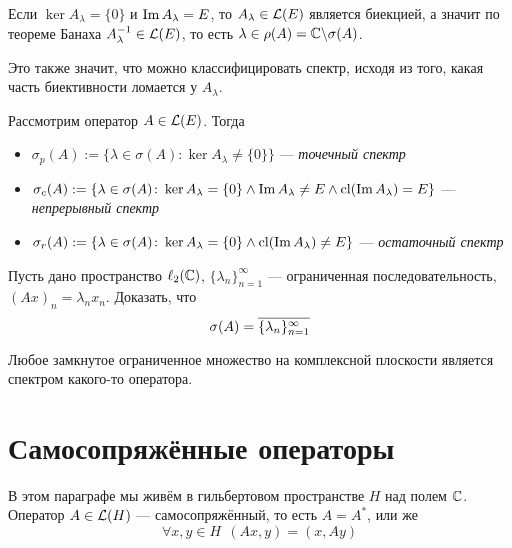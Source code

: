 \begin{note}
	Если $\ker A_\lambda = \{0\}$ и  $\operatorname{Im} A_\lambda = E$, то $A_\lambda \in \mathcal{L}(E)$ является биекцией, а значит по теореме Банаха $A_\lambda^{-1} \in \mathcal{L}(E)$, то есть $\lambda \in \rho(A) = \mathbb{C} \backslash \sigma(A)$.
	
	Это также значит, что можно классифицировать спектр, исходя из того, какая часть биективности ломается у $A_\lambda$.
\end{note}

\begin{definition}
	Рассмотрим оператор $A \in \mathcal{L}(E)$. Тогда
	\begin{itemize}
		\item $\sigma_p(A) := \{\lambda \in \sigma(A) \colon \ker A_\lambda \neq \{0\}\}$ --- \textit{точечный спектр}
		
		\item $\sigma_c(A) := \{\lambda \in \sigma(A) \colon \ker A_\lambda = \{0\} \wedge \operatorname{Im} A_\lambda \neq E \wedge \operatorname{cl} (\operatorname{Im} A_\lambda) = E\}$ --- \textit{непрерывный спектр}
		
		\item $\sigma_r(A) := \{\lambda \in \sigma(A) \colon \ker A_\lambda = \{0\} \wedge \operatorname{cl} (\operatorname{Im} A_\lambda) \neq E\}$ --- \textit{остаточный спектр}
	\end{itemize}
\end{definition}
	
\begin{exercise}
	Пусть дано пространство $\ell_2(\mathbb{C})$, $\{\lambda_n\}_{n = 1}^\infty$ --- ограниченная последовательность, $(Ax)_n = \lambda_nx_n$. Доказать, что
	\[
		\sigma(A) = \overline{\{\lambda_n\}_{n = 1}^\infty}
	\]
\end{exercise}

\begin{corollary}
	Любое замкнутое ограниченное множество на комплексной плоскости является спектром какого-то оператора.
\end{corollary}

\section{Самосопряжённые операторы}

\begin{note}
	В этом параграфе мы живём в гильбертовом пространстве $H$ над полем $\mathbb{C}$. Оператор $A \in \mathcal{L}(H)$ --- самосопряжённый, то есть $A = A^*$, или же
	\[
		\forall x, y \in H\ \ (Ax, y) = (x, Ay)
	\]
\end{note}

